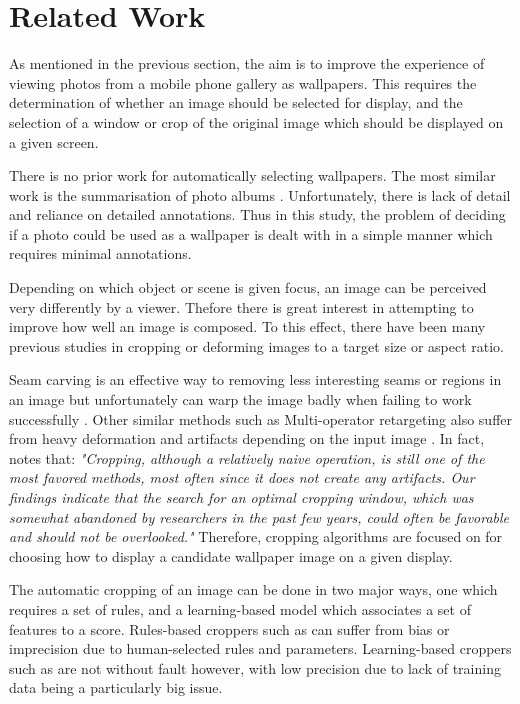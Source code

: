%
\newpage
\chapter{Related Work}

As mentioned in the previous section, the aim is to improve the experience of
viewing photos from a mobile phone gallery as wallpapers.
This requires the determination of whether an image should be selected for
display, and the selection of a window or crop of the original image which
should be displayed on a given screen.

There is no prior work for automatically selecting wallpapers.
The most similar work is the summarisation of photo albums
\cite{sinha2009personal}.
Unfortunately, there is lack of detail and reliance on detailed
annotations.
Thus in this study, the problem of deciding if a photo could be used as a
wallpaper is dealt with in a simple manner which requires minimal annotations.

Depending on which object or scene is given focus, an image can be perceived
very differently by a viewer.
Thefore there is great interest in attempting to improve how well an image is
composed.
To this effect, there have been many previous studies in cropping or deforming
images to a target size or aspect ratio.

Seam carving is an effective way to removing less
interesting seams or regions in an image but unfortunately can warp the image
badly when failing to work successfully \cite{avidan2007seam}.
Other similar methods such as Multi-operator retargeting also suffer from
heavy deformation and artifacts depending on the input image \cite{rubinstein2009multi}.
In fact, \cite{rubinstein2010comparative} notes that:
\emph{"Cropping, although a relatively naive operation, is still one of the most
	favored methods, most often since it does not create any artifacts. Our
	findings indicate that the search for an optimal cropping window, which
	was somewhat abandoned by researchers in the past few years, could often
	be favorable and should not be overlooked."}
Therefore, cropping algorithms are focused on for choosing how to display a
candidate wallpaper image on a given display.

The automatic cropping of an image can be done in two major ways, one which
requires a set of rules, and a learning-based model which associates a set of
features to a score.
Rules-based croppers such as \cite{liu2010optimizing, zhang2005auto} can suffer
from bias or imprecision due to human-selected rules and parameters.
Learning-based croppers such as \cite{park2012modeling, yan2013learning} are
not without fault however, with low precision due to lack of training data being
a particularly big issue.

